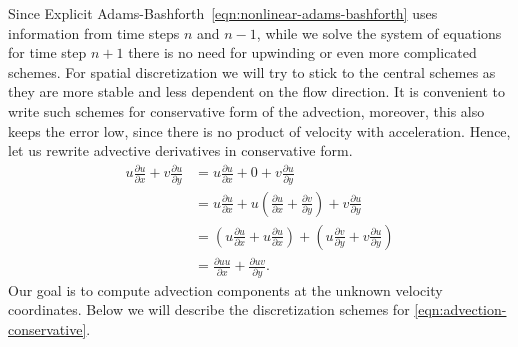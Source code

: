 \documentclass{article}
\numberwithin{equation}{section}
\begin{document}
Since Explicit Adams-Bashforth~\cref{eqn:nonlinear-adams-bashforth} uses information from time steps $n$ and $n-1$, while we solve the system of equations for time step $n+1$ there is no need for upwinding or even more complicated schemes. For spatial discretization we will try to stick to the central schemes as they are more stable and less dependent on the flow direction. It is convenient to write such schemes for conservative form of the advection, moreover, this also keeps the error low, since there is no product of velocity with acceleration. Hence, let us rewrite advective derivatives in conservative form. 
\begin{align}\label{eqn:advection-conservative}
	u\frac{\partial u}{\partial x}+v \frac{\partial u}{\partial y}
	&=u\frac{\partial u}{\partial x}+0+v \frac{\partial u}{\partial y}\nonumber\\
	&= u\frac{\partial u}{\partial x}+ u\left(\frac{\partial u}{\partial x} +\frac{\partial v}{\partial y}\right ) +v \frac{\partial u}{\partial y}\nonumber\\
	&=\left(u\frac{\partial u}{\partial x}+ u\frac{\partial u}{\partial x}\right ) +\left(u\frac{\partial v}{\partial y} +v \frac{\partial u}{\partial y}\right )\nonumber\\
	&=\frac{\partial uu}{\partial x}+ \frac{\partial uv}{\partial y}.
\end{align}
Our goal is to compute advection components at the unknown velocity coordinates. Below we will describe the discretization schemes for \cref{eqn:advection-conservative}. 
\end{document}
